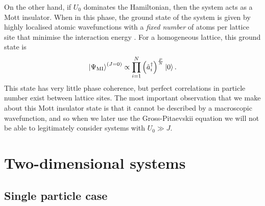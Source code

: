 \documentclass[prb, twocolumn, final]{revtex4-1}
\theoremstyle{plain}
\begin{document}
On the other hand, if $U_{0}$ dominates the Hamiltonian, then the
system acts as a Mott insulator. When in this phase, the
ground state of the system is given by highly localised atomic wavefunctions
with a \emph{fixed number} of atoms per lattice site that minimise the
interaction energy \cite{Bloch2005}. For a homogeneous lattice, this ground
state is
\begin{equation}
    \ket{\Psi_{\text{MI}}}^{\left(J=0\right)}
    \propto
    \prod_{i=1}^N \left( \hat{a}_i^\dagger \right)^\frac{P}{N}
    \ket{0}.
\end{equation}
This state has very little phase coherence, but perfect correlations in particle
number exist between lattice sites. The most important observation that we make about this
Mott insulator state is that it cannot be described by a macroscopic
wavefunction, and so when we later use the Gross-Pitaevskii equation we will
not be able to legitimately consider systems with $U_{0} \gg J$.


\section{Two-dimensional systems\label{2Dsystems}}

\subsection{Single particle case\label{2Dnon-interactingsection}}
\end{document}
